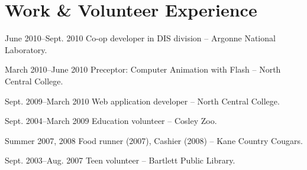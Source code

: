 \documentclass[11pt]{simplecv}
\begin{document}
  \section{Work \& Volunteer Experience}
  \begin{topic}
    \item[June 2010--Sept. 2010] Co-op developer in DIS division -- Argonne National Laboratory.
    \item[March 2010--June 2010] Preceptor: Computer Animation with Flash -- North Central College.
    \item[Sept. 2009--March 2010] Web application developer -- North Central College.
    \item[Sept. 2004--March 2009] Education volunteer -- Cosley Zoo.
    \item[Summer 2007, 2008] Food runner (2007), Cashier (2008) -- Kane Country Cougars.
    \item[Sept. 2003--Aug. 2007] Teen volunteer -- Bartlett Public Library.
  \end{topic}
\end{document}
